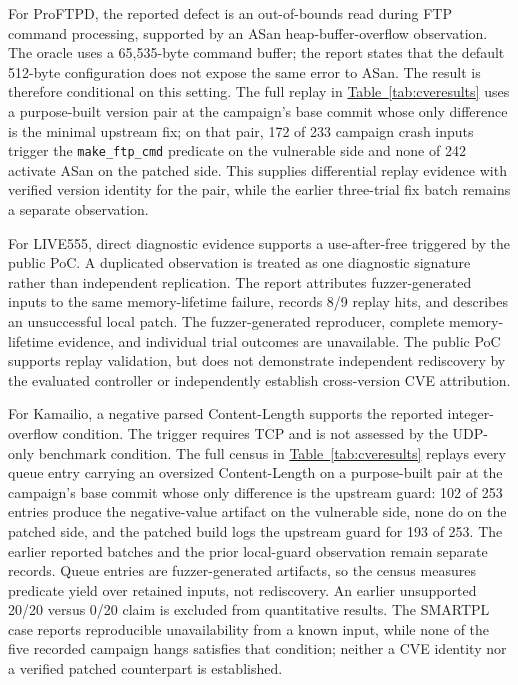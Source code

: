 \documentclass[final,5p,times,number]{elsarticle}
\newcommand{\namedref}[2]{\hyperref[#2]{#1~\ref*{#2}}}
\begin{document}
For ProFTPD, the reported defect is an out-of-bounds read during FTP command processing, supported by an ASan heap-buffer-overflow observation. The oracle uses a 65,535-byte command buffer; the report states that the default 512-byte configuration does not expose the same error to ASan. The result is therefore conditional on this setting. The full replay in \namedref{Table}{tab:cveresults} uses a purpose-built version pair at the campaign's base commit whose only difference is the minimal upstream fix; on that pair, 172 of 233 campaign crash inputs trigger the \texttt{make\_ftp\_cmd} predicate on the vulnerable side and none of 242 activate ASan on the patched side. This supplies differential replay evidence with verified version identity for the pair, while the earlier three-trial fix batch remains a separate observation.

For LIVE555, direct diagnostic evidence supports a use-after-free triggered by the public PoC. A duplicated observation is treated as one diagnostic signature rather than independent replication. The report attributes fuzzer-generated inputs to the same memory-lifetime failure, records 8/9 replay hits, and describes an unsuccessful local patch. The fuzzer-generated reproducer, complete memory-lifetime evidence, and individual trial outcomes are unavailable. The public PoC supports replay validation, but does not demonstrate independent rediscovery by the evaluated controller or independently establish cross-version CVE attribution.

For Kamailio, a negative parsed Content-Length supports the reported integer-overflow condition. The trigger requires TCP and is not assessed by the UDP-only benchmark condition. The full census in \namedref{Table}{tab:cveresults} replays every queue entry carrying an oversized Content-Length on a purpose-built pair at the campaign's base commit whose only difference is the upstream guard: 102 of 253 entries produce the negative-value artifact on the vulnerable side, none do on the patched side, and the patched build logs the upstream guard for 193 of 253. The earlier reported batches and the prior local-guard observation remain separate records. Queue entries are fuzzer-generated artifacts, so the census measures predicate yield over retained inputs, not rediscovery. An earlier unsupported 20/20 versus 0/20 claim is excluded from quantitative results. The SMARTPL case reports reproducible unavailability from a known input, while none of the five recorded campaign hangs satisfies that condition; neither a CVE identity nor a verified patched counterpart is established.
\end{document}
